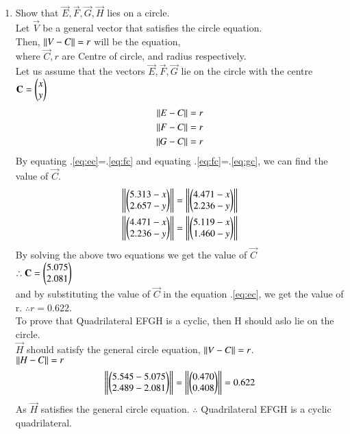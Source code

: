 
\renewcommand{\theequation}{\theenumi}
\begin{enumerate}[label=\thesection.\arabic*.,ref=\thesection.\theenumi]
	
\item Show that $\vec{E},\vec{F},\vec{G},\vec{H}$ lies on a circle.
\\
\solution Let $\vec{V}$ be a general vector that satisfies the circle equation.
\\
Then, $\left\lVert V-C\right\rVert=r$ will be the equation,
\\
where $\vec{C},r$ are Centre of circle, and radius respectively.
\\
Let us assume that the vectors $\vec{E},\vec{F},\vec{G}$ lie on the circle with the centre $\mathbf{C}=\begin{pmatrix}x\\y\end{pmatrix}$
\begin{align}
\label{eq:ec}
\left\lVert E-C\right\rVert=r
\\
\label{eq:fc}
\left\lVert F-C\right\rVert=r
\\
\label{eq:gc}
\left\lVert G-C\right\rVert=r
\end{align}
By equating .\eqref{eq:ec}=.\eqref{eq:fc} and equating .\eqref{eq:fc}=.\eqref{eq:gc}, we can find the value of $\vec{C}$.
\begin{align}
\left\lVert\begin{pmatrix}5.313-x\\2.657-y\end{pmatrix}\right\rVert=\left\lVert\begin{pmatrix}4.471-x\\2.236-y\end{pmatrix}\right\rVert
\\
\left\lVert\begin{pmatrix}4.471-x\\2.236-y\end{pmatrix}\right\rVert=\left\lVert\begin{pmatrix}5.119-x\\1.460-y\end{pmatrix}\right\rVert
\end{align}
By solving the above two equations we get the value of $\vec{C}$
\\
$\therefore \mathbf{C}=\begin{pmatrix}5.075\\2.081\end{pmatrix}$
\\
and by substituting the value of $\vec{C}$ in the equation .\eqref{eq:ec}, we get the value of r.
$\therefore r=0.622$.
\\
To prove that Quadrilateral EFGH is a cyclic, then H should aslo lie on the circle.
\\ 
$\vec{H}$ should satisfy the general circle equation, $\left\lVert V-C\right\rVert=r$.
\\
$\left\lVert H-C\right\rVert=r$
\begin{align}
\left\lVert\begin{pmatrix}5.545-5.075\\2.489-2.081\end{pmatrix}\right\rVert=
\left\lVert\begin{pmatrix}0.470\\0.408\end{pmatrix}\right\rVert=0.622
\end{align}
As $\vec{H}$ satisfies the general circle equation.
\newline
$\therefore$ Quadrilateral EFGH is a cyclic quadrilateral.

\end{enumerate}
